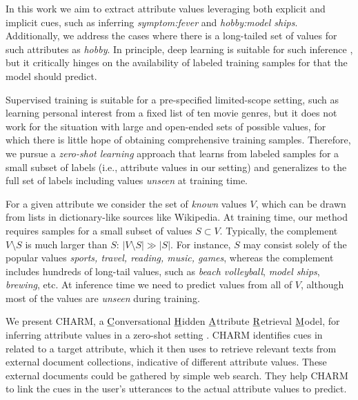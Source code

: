 In this work we 
aim to extract
attribute values leveraging both explicit and implicit cues, such as inferring \textit{symptom:fever} and \textit{hobby:model ships}.
Additionally, we address the cases where there is a long-tailed set of
values for such attributes as {\em hobby}. 
In principle, deep learning is suitable for such inference \cite{tigunova:ham:2019, pietro:ACL15, Rao:2010}, but it critically hinges on the availability of labeled
training samples for  
that the model should predict.

Supervised training is suitable for a pre-specified limited-scope setting, such as learning
personal interest from a fixed list of ten movie genres, but it does not
work for the situation with large and open-ended sets of possible values,
for which there is little hope of obtaining comprehensive training samples.
Therefore, we pursue a {\em zero-shot learning} \cite{larochelle2008zero, palatucci2009zero} 
approach that learns from
labeled samples for a small subset of labels (i.e., attribute values in our
setting) and generalizes to the full set of labels including values {\em unseen}
at training time.

For a given attribute we consider the set of \emph{known} values $V$, which can be drawn from lists in dictionary-like sources like Wikipedia. 
At training time, our method requires samples for a small 
subset of values $S \subset V$.
Typically, the complement $V \setminus S$
is much larger than $S$: $|V \setminus S| \gg |S|$.
For instance, $S$ may consist solely
of the popular values \emph{sports, travel,
reading, music, games}, whereas the complement
includes hundreds of long-tail values, such as
\emph{beach volleyball}, \emph{model ships}, \emph{brewing}, etc.
At inference time
we need to predict values from
all of $V$, although most of the values are \textit{unseen} during training.

\vspace{0.1cm}
We present CHARM, a 
$\underline{\rm C}$onversational 
$\underline{\rm H}$idden 
$\underline{\rm A}$ttribute 
$\underline{\rm R}$etrieval 
$\underline{\rm M}$odel, 
for inferring attribute values in a zero-shot setting \cite{tigunova2020charm}.
CHARM identifies cues in related to a target attribute, which it then uses to retrieve relevant texts from external document collections, indicative of different attribute values.
These external documents could be gathered by simple web search.
They help CHARM to link the cues in the user's utterances 
to the actual attribute values to predict.

